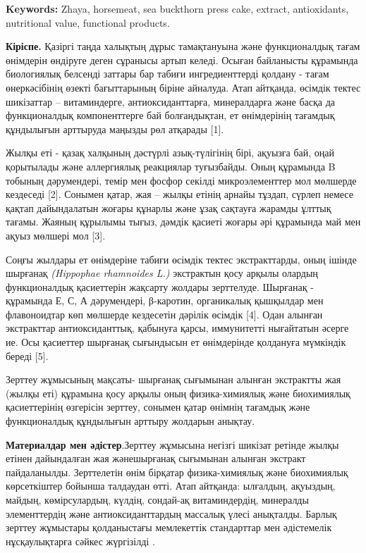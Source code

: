 {\bfseries Keywords:} Zhaya, horsemeat, sea buckthorn press cake, extract,
antioxidants, nutritional value, functi\-onal products.

\begin{multicols}{2}
{\bfseries Кіріспе.} Қазіргі таңда халықтың дұрыс тамақтануына және
функционалдық тағам өнімдерін өндіруге деген сұранысы артып келеді.
Осыған байланысты құрамында биологиялық белсенді заттары бар табиғи
ингредиенттерді қолдану - тағам өнеркәсібінің өзекті бағыттарының біріне
айналуда. Атап айтқанда, өсімдік тектес шикізаттар -- витаминдерге,
антиоксиданттарға, минералдарға және басқа да функционалдық
компоненттерге бай болғандықтан, ет өнімдерінің тағамдық құндылығын
арттыруда маңызды рөл атқарады {[}1{]}.

Жылқы еті - қазақ халқының дәстүрлі азық-түлігінің бірі, ақуызға бай,
оңай қорытылады және аллергиялық реакциялар туғызбайды. Оның құрамында B
тобының дәрумендері, темір мен фосфор секілді микроэлементтер мол
мөлшерде кездеседі {[}2{]}. Сонымен қатар, жая -- жылқы етінің арнайы
тұздап, сүрлеп немесе қақтап дайындалатын жоғары құнарлы және ұзақ
сақтауға жарамды ұлттық тағамы. Жаяның құрылымы тығыз, дәмдік қасиеті
жоғары әрі құрамында май мен ақуыз мөлшері мол {[}3{]}.

Соңғы жылдары ет өнімдеріне табиғи өсімдік тектес экстракттарды, оның
ішінде шырғанақ \emph{(Hippophae rhamnoides L.)} экстрактын қосу арқылы
олардың функционалдық қасиеттерін жақсарту жолдары зерттелуде. Шырғанақ
- құрамында Е, С, А дәрумендері, β-каротин, органикалық қышқылдар мен
флавоноидтар көп мөлшерде кездесетін дәрілік өсімдік {[}4{]}. Одан
алынған экстракттар антиоксиданттық, қабынуға қарсы, иммунитетті
нығайтатын әсерге ие. Осы қасиеттер шырғанақ сығындысын ет өнімдерінде
қолдануға мүмкіндік береді {[}5{]}.

Зерттеу жұмысының мақсаты- шырғанақ сығымынан алынған экстрактты жая
(жылқы еті) құрамына қосу арқылы оның физика-химиялық және биохимиялық
қасиеттерінің өзгерісін зерттеу, сонымен қатар өнімнің тағамдық және
функционалдық құндылығын арттыру жолдарын анықтау.

{\bfseries Материалдар мен әдістер}.Зерттеу жұмысына негізгі шикізат
ретінде жылқы етінен дайындалған жая жәнешырғанақ сығымынан алынған
экстракт пайдаланылды. Зерттелетін өнім бірқатар физика-химиялық және
биохимиялық көрсеткіштер бойынша талдаудан өтті. Атап айтқанда:
ылғалдың, ақуыздың, майдың, көмірсулардың, күлдің, сондай-ақ
витаминдердің, минералды элементтердің және антиоксиданттардың массалық
үлесі анықталды. Барлық зерттеу жұмыстары қолданыстағы мемлекеттік
стандарттар мен әдістемелік нұсқаулықтарға сәйкес жүргізілді .


\end{multicols}
